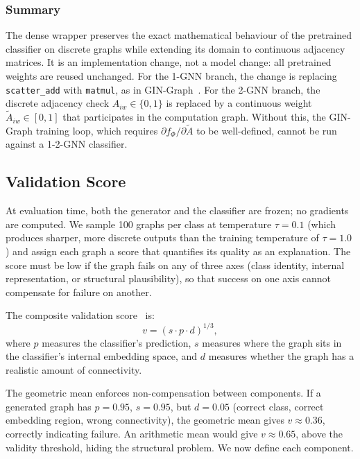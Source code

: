\documentclass[12pt,a4paper]{article}
\begin{document}
\subsubsection{Summary}

The dense wrapper preserves the exact mathematical behaviour of the pretrained classifier on discrete graphs while extending its domain to continuous adjacency matrices. It is an implementation change, not a model change: all pretrained weights are reused unchanged. For the 1-GNN branch, the change is replacing \texttt{scatter\_add} with \texttt{matmul}, as in GIN-Graph~\cite{sun2025gingraph}. For the 2-GNN branch, the discrete adjacency check $A_{iw} \in \{0, 1\}$ is replaced by a continuous weight $\tilde{A}_{iw} \in [0, 1]$ that participates in the computation graph. Without this, the GIN-Graph training loop, which requires $\partial f_\Phi / \partial \tilde{A}$ to be well-defined, cannot be run against a 1-2-GNN classifier.

\subsection{Validation Score}
\label{sec:validation}

At evaluation time, both the generator and the classifier are frozen; no gradients are computed. We sample 100 graphs per class at temperature $\tau = 0.1$ (which produces sharper, more discrete outputs than the training temperature of $\tau = 1.0$) and assign each graph a score that quantifies its quality as an explanation. The score must be low if the graph fails on any of three axes (class identity, internal representation, or structural plausibility), so that success on one axis cannot compensate for failure on another.

The composite validation score~\cite{sun2025gingraph} is:
\begin{equation}
  v = (s \cdot p \cdot d)^{1/3},
  \label{eq:validation}
\end{equation}
where $p$ measures the classifier's prediction, $s$ measures where the graph sits in the classifier's internal embedding space, and $d$ measures whether the graph has a realistic amount of connectivity.

The geometric mean enforces non-compensation between components. If a generated graph has $p = 0.95$, $s = 0.95$, but $d = 0.05$ (correct class, correct embedding region, wrong connectivity), the geometric mean gives $v \approx 0.36$, correctly indicating failure. An arithmetic mean would give $v \approx 0.65$, above the validity threshold, hiding the structural problem. We now define each component.
\end{document}
